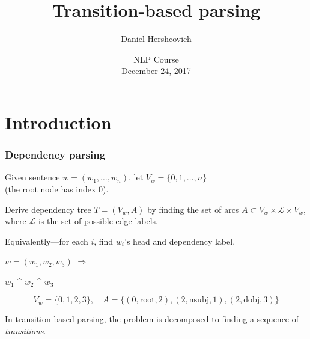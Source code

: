\documentclass[t]{beamer}
\title{Transition-based parsing}
\author{Daniel Hershcovich}
\date{NLP Course \\ December 24, 2017}
\begin{document}
\frame{\titlepage}




\section{Introduction}

\begin{frame}
  \frametitle{Dependency parsing}
  Given sentence $w=(w_1, \ldots, w_n)$,
  let $V_w=\{0, 1, \ldots, n \}$ \\
  (the root node has index 0).
  
  Derive dependency tree $T=(V_w,A)$ by finding the set of arcs
  $A \subset V_w \times \mathcal{L} \times V_w$,
  where $\mathcal{L}$ is the set of possible edge labels.
  
  \vfill

  Equivalently---for each $i$, find $w_i$'s head and dependency label.
  
  \pause
  
  \begin{center}
	  \begin{minipage}{4cm}
	    $w=(w_1, w_2, w_3)$ \hfill $\Rightarrow$
	  \end{minipage}
	  \begin{minipage}{5cm}
	    \begin{dependency}
	      \begin{deptext}[column sep=1.5em,ampersand replacement=\^,font=\rmfamily]
	        $w_1$ \^ $w_2$ \^ $w_3$ \\
	      \end{deptext}
	    \end{dependency}
	  \end{minipage}
  \end{center}
  \[
      V_w=\{0,1,2,3\}, \quad
      A=\{(0,\mathrm{root},2),(2,\mathrm{nsubj},1),(2,\mathrm{dobj},3)\}
  \]
  
  \pause

  In transition-based parsing,
  the problem is decomposed to finding a sequence of \textit{transitions}.
\end{frame}
\end{document}
